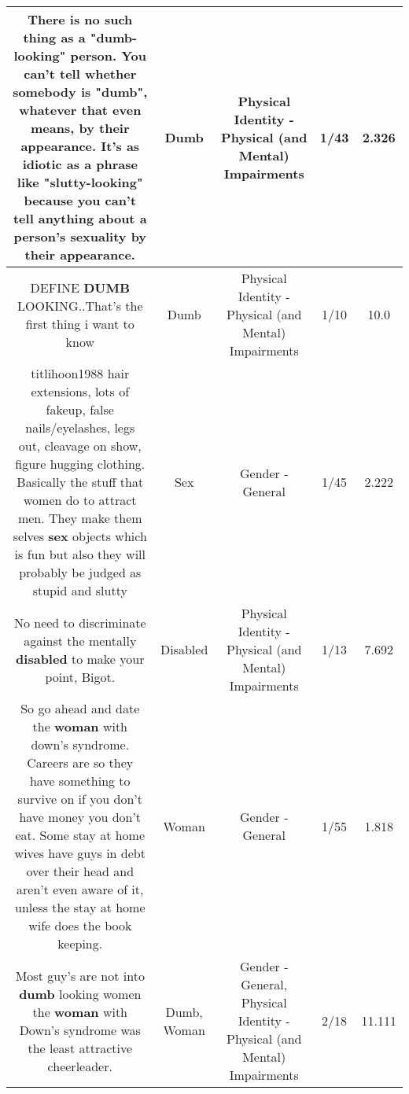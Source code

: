 \documentclass[11pt]{article}
\newlength\mylength
\begin{document}
\begin{center}
\begin{longtable}{|C{.65\mylength}|C{.30\mylength}|C{.12\mylength}|C{.12\mylength}|C{.12\mylength}|}
  \small There is no such thing as a "\textbf{dumb}-looking" person. You can't tell whether somebody is "\textbf{dumb}", whatever that even means, by their appearance. It's as idiotic as a phrase like "slutty-looking" because you can't tell anything about a person's sexuality by their appearance.\normalsize   & Dumb & Physical Identity - Physical (and Mental) Impairments & 1/43 & 2.326 \\  \hline
  \small DEFINE \textbf{DUMB} LOOKING..That's the first thing i want to know\normalsize   & Dumb & Physical Identity - Physical (and Mental) Impairments & 1/10 & 10.0 \\  \hline
  \small titlihoon1988 hair extensions, lots of fakeup, false nails/eyelashes, legs out, cleavage on show, figure hugging clothing. Basically the stuff that women do to attract men. They make them selves \textbf{sex} objects which is fun but also they will probably be judged as stupid and slutty\normalsize   & Sex & Gender - General & 1/45 & 2.222 \\  \hline
  \small No need to discriminate against the mentally \textbf{disabled} to make your point, Bigot.\normalsize   & Disabled & Physical Identity - Physical (and Mental) Impairments & 1/13 & 7.692 \\  \hline
  \small So go ahead and date the \textbf{woman} with down's syndrome. Careers are so they have something to survive on if you don't have money you don't eat. Some stay at home wives have guys in debt over their head and aren't even aware of it, unless the stay at home wife does the book keeping.\normalsize   & Woman & Gender - General & 1/55 & 1.818 \\  \hline
  \small Most guy's are not into \textbf{dumb} looking women the \textbf{woman} with Down's syndrome was the least attractive cheerleader.\normalsize   & Dumb, Woman & Gender - General, Physical Identity - Physical (and Mental) Impairments & 2/18 & 11.111 \\  \hline

\end{longtable}
\end{center}
\end{document}

